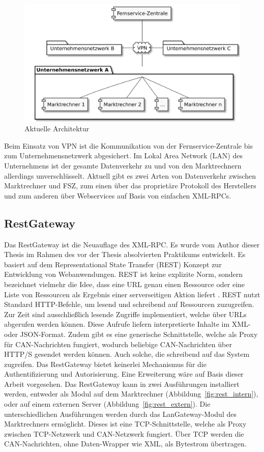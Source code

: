 \documentclass[11pt,a4paper]{report}
\begin{document}
\begin{figure}[htbp]
\centering
\includegraphics[scale=0.19]{images/problemfeld.pdf}
\caption{Aktuelle Architektur}
\label{fig:current_setup}
\end{figure}

Beim Einsatz von VPN ist die Kommunikation von der Fernservice-Zentrale bis zum Unternehmensnetzwerk abgesichert. Im Lokal Area Network (LAN) des Unternehmens ist der gesamte Datenverkehr zu und von den Marktrechnern allerdings unverschlüsselt. Aktuell gibt es zwei Arten von Datenverkehr zwischen Marktrechner und FSZ, zum einen über das proprietäre Protokoll des Herstellers und zum anderen über Webservices auf Basis von einfachen XML-RPCs.

\subsection{RestGateway} \label{sec:g_restgateway}

Das RestGateway ist die Neuauflage des XML-RPC. Es wurde vom Author dieser Thesis im Rahmen des vor der Thesis absolvierten Praktikums entwickelt. Es basiert auf dem Representational State Transfer (REST) Konzept zur Entwicklung von Webanwendungen. REST ist keine explizite Norm, sondern bezeichnet vielmehr die Idee, dass eine URL genau einen Ressource oder eine Liste von Ressourcen als Ergebnis einer serverseitigen Aktion liefert \cite{wiki_rest}. REST nutzt Standard HTTP-Befehle, um lesend und schreibend auf Ressourcen zuzugreifen. Zur Zeit sind ausschließlich lesende Zugriffe implementiert, welche über URLs abgerufen werden können. Diese Aufrufe liefern interpretierte Inhalte im XML- oder JSON-Format. Zudem gibt es eine generische Schnittstelle, welche als Proxy für CAN-Nachrichten fungiert, wodurch beliebige CAN-Nachrichten über HTTP/S gesendet werden können. Auch solche, die schreibend auf das System zugreifen. Das RestGateway bietet keinerlei Mechanismus für die Authentifizierung und Autorisierung. Eine Erweiterung wäre auf Basis dieser Arbeit vorgesehen. Das RestGateway kann in zwei Ausführungen installiert werden, entweder als Modul auf dem Marktrechner (Abbildung~\ref{fig:rest_intern}), oder auf einem externen Server (Abbildung~\ref{fig:rest_extern}). Die unterschiedlichen Ausführungen werden durch das LanGateway-Modul des Marktrechners ermöglicht. Dieses ist eine TCP-Schnittstelle, welche als Proxy zwischen TCP-Netzwerk und CAN-Netzwerk fungiert. Über TCP werden die CAN-Nachrichten, ohne Daten-Wrapper wie XML, als Bytestrom übertragen.
\end{document}
